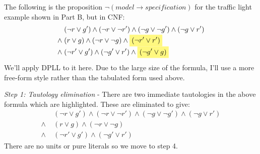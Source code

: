 \begin{example}
The following is the proposition $\neg (\textit{model}
\rightarrow \textit{specification})$ for the traffic light
example shown in Part B, but in CNF:
%
\begin{align*}
& (\neg r \vee g') \wedge (\neg r \vee \neg r') \wedge (\neg g \vee \neg
  g') \wedge (\neg g \vee r') \\[-0.3em]
\wedge \; & (r \vee g) \wedge (\neg r \vee \neg g) \wedge \highlight{(\neg r' \vee r')} \\[-0.4em]
\wedge  \; & (\neg r' \vee g') \wedge (\neg g' \vee r') \wedge \highlight{(\neg g' \vee g)}
\end{align*}
%
We'll apply DPLL to it here. Due to the large size of the formula,
I'll use a more free-form style rather than the tabulated form
used above.

\textit{Step 1: Tautology elimination} - There are two immediate
tautologies in the above formula which are highlighted.
These are eliminated to give:
%
\begin{align*}
& (\neg r \vee g') \wedge (\neg r \vee \neg r') \wedge (\neg g \vee \neg
  g') \wedge (\neg g \vee r') \\
 \wedge \; & (r \vee g) \wedge (\neg r \vee \neg g) \\
\wedge \; & (\neg r' \vee g') \wedge (\neg g' \vee r')
\end{align*}
%
There are no units or pure literals so we move to step 4.


\end{example}
